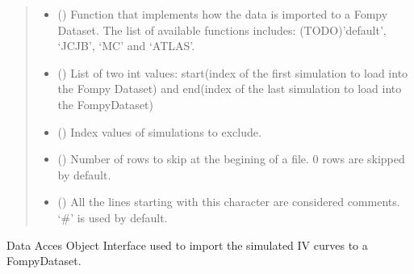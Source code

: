 \documentclass[letterpaper,10pt,english,openany, oneside]{sphinxmanual}
\begin{document}
\begin{fulllineitems}
\begin{fulllineitems}
\begin{quote}
\begin{description}
\begin{itemize}
\item {} 
 () \textendash{} Function that implements how the data is imported to a Fompy Dataset. The list of available functions includes:
(TODO)’default’, ‘JCJB’, ‘MC’ and ‘ATLAS’.

\item {} 
 () \textendash{} List of two int values: start(index of the first simulation to load into the Fompy Dataset)
and end(index of the last simulation to load into the FompyDataset)

\item {} 
 () \textendash{} Index values of simulations to exclude.

\item {} 
 () \textendash{} Number of rows to skip at the begining of a file. 0 rows are skipped by default.

\item {} 
 () \textendash{} All the lines starting with this character are considered comments.
‘\#’ is used by default.

\end{itemize}

\end{description}\end{quote}

\end{fulllineitems}


\end{fulllineitems}


\begin{fulllineitems}
\label{\detokenize{index:fompy.fds.dataDAO}}
Data Acces Object Interface used to import the simulated IV curves to a FompyDataset.

\end{fulllineitems}

\end{document}
